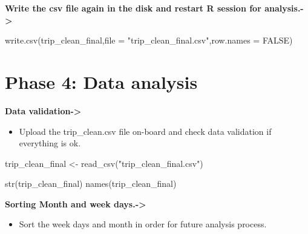 \documentclass[
]{article}
\newenvironment{Shaded}{\begin{snugshade}}{\end{snugshade}}
\newcommand{\AttributeTok}[1]{\textcolor[rgb]{0.77,0.63,0.00}{#1}}
\newcommand{\ConstantTok}[1]{\textcolor[rgb]{0.00,0.00,0.00}{#1}}
\newcommand{\FunctionTok}[1]{\textcolor[rgb]{0.00,0.00,0.00}{#1}}
\newcommand{\NormalTok}[1]{#1}
\newcommand{\OtherTok}[1]{\textcolor[rgb]{0.56,0.35,0.01}{#1}}
\newcommand{\StringTok}[1]{\textcolor[rgb]{0.31,0.60,0.02}{#1}}
\providecommand{\tightlist}{%
  \setlength{\itemsep}{0pt}\setlength{\parskip}{0pt}}
\begin{document}
\textbf{Write the csv file again in the disk and restart R session for
analysis.-\textgreater{}}

\begin{Shaded}
\begin{Highlighting}[]
\FunctionTok{write.csv}\NormalTok{(trip\_clean\_final,}\AttributeTok{file =} \StringTok{"trip\_clean\_final.csv"}\NormalTok{,}\AttributeTok{row.names =} \ConstantTok{FALSE}\NormalTok{)}
\end{Highlighting}
\end{Shaded}

\hypertarget{phase-4-data-analysis}{%
\section{\texorpdfstring{\textbf{Phase 4: Data
analysis}}{Phase 4: Data analysis}}\label{phase-4-data-analysis}}

\textbf{Data validation-\textgreater{}}

\begin{itemize}
\tightlist
\item
  Upload the trip\_clean.csv file on-board and check data validation if
  everything is ok.
\end{itemize}

\begin{Shaded}
\begin{Highlighting}[]
\NormalTok{trip\_clean\_final }\OtherTok{\textless{}{-}} \FunctionTok{read\_csv}\NormalTok{(}\StringTok{"trip\_clean\_final.csv"}\NormalTok{)}

\FunctionTok{str}\NormalTok{(trip\_clean\_final)}
\FunctionTok{names}\NormalTok{(trip\_clean\_final)}
\end{Highlighting}
\end{Shaded}

\textbf{Sorting Month and week days.-\textgreater{}}

\begin{itemize}
\tightlist
\item
  Sort the week days and month in order for future analysis process.
\end{itemize}
\end{document}
